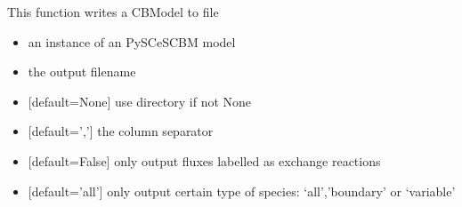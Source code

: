 \documentclass[letterpaper,10pt,english]{sphinxmanual}
\begin{document}

\begin{fulllineitems}
\label{\detokenize{modules_doc:cbmpy.CBWrite.writeModelInfoToFile}}
\pysigstartsignatures
{}
\pysigstopsignatures
\sphinxAtStartPar
This function writes a CBModel to file
\begin{itemize}
\item {} 
\sphinxAtStartPar
{} an instance of an PySCeSCBM model

\item {} 
\sphinxAtStartPar
{} the output filename

\item {} 
\sphinxAtStartPar
{} {[}default=None{]} use directory if not None

\item {} 
\sphinxAtStartPar
{} {[}default=’,’{]} the column separator

\item {} 
\sphinxAtStartPar
{} {[}default=False{]} only output fluxes labelled as exchange reactions

\item {} 
\sphinxAtStartPar
{} {[}default=’all’{]} only output certain type of species: ‘all’,’boundary’ or ‘variable’

\end{itemize}

\end{fulllineitems}

\end{document}
